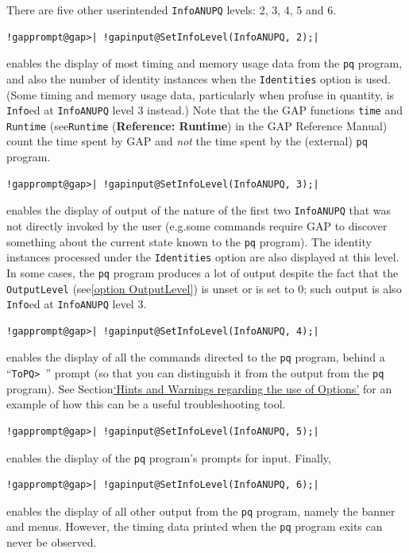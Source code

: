 \documentclass[a4paper,11pt]{report}
\begin{document}
{{{ There are five other user\texttt{}intended \texttt{InfoANUPQ} levels: 2, 3, 4, 5 and 6. 
\begin{Verbatim}[commandchars=!@|,fontsize=\small,frame=single,label=Example]
  !gapprompt@gap>| !gapinput@SetInfoLevel(InfoANUPQ, 2);|
\end{Verbatim}
 enables the display of most timing and memory usage data from the \texttt{pq} program, and also the number of identity instances when the \texttt{Identities} option is used. (Some timing and memory usage data, particularly when profuse
in quantity, is \texttt{Info}\texttt{}ed at \texttt{InfoANUPQ} level 3 instead.) Note that the the \textsf{GAP} functions \texttt{time} and \texttt{Runtime} (see{\nobreakspace}\texttt{Runtime} (\textbf{Reference: Runtime}) in the \textsf{GAP} Reference Manual) count the time spent by \textsf{GAP} and \emph{not} the time spent by the (external) \texttt{pq} program. 
\begin{Verbatim}[commandchars=!@|,fontsize=\small,frame=single,label=Example]
  !gapprompt@gap>| !gapinput@SetInfoLevel(InfoANUPQ, 3);|
\end{Verbatim}
 enables the display of output of the nature of the first two \texttt{InfoANUPQ} that was not directly invoked by the user (e.g.{\nobreakspace}some commands
require \textsf{GAP} to discover something about the current state known to the \texttt{pq} program). The identity instances processed under the \texttt{Identities} option are also displayed at this level. In some cases, the \texttt{pq} program produces a lot of output despite the fact that the \texttt{OutputLevel} (see{\nobreakspace}\ref{option OutputLevel}) is unset or is set to 0; such output is also \texttt{Info}\texttt{}ed at \texttt{InfoANUPQ} level 3. 
\begin{Verbatim}[commandchars=!@|,fontsize=\small,frame=single,label=Example]
  !gapprompt@gap>| !gapinput@SetInfoLevel(InfoANUPQ, 4);|
\end{Verbatim}
 enables the display of all the commands directed to the \texttt{pq} program, behind a ``\texttt{ToPQ{\textgreater} }'' prompt (so that you can distinguish it from the output from the \texttt{pq} program). See Section{\nobreakspace}\hyperref[Hints and Warnings regarding the use of Options]{`Hints and Warnings regarding the use of Options'} for an example of how this can be a useful troubleshooting tool. 
\begin{Verbatim}[commandchars=!@|,fontsize=\small,frame=single,label=Example]
  !gapprompt@gap>| !gapinput@SetInfoLevel(InfoANUPQ, 5);|
\end{Verbatim}
 enables the display of the \texttt{pq} program's prompts for input. Finally, 
\begin{Verbatim}[commandchars=!@|,fontsize=\small,frame=single,label=Example]
  !gapprompt@gap>| !gapinput@SetInfoLevel(InfoANUPQ, 6);|
\end{Verbatim}
 enables the display of all other output from the \texttt{pq} program, namely the banner and menus. However, the timing data printed when
the \texttt{pq} program exits can never be observed. }

}}
\end{document}
